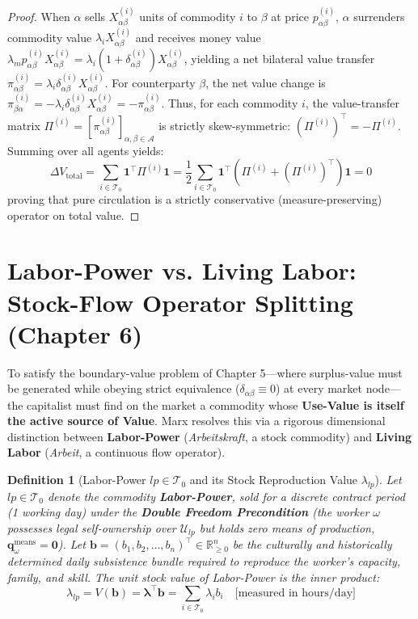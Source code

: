\documentclass[11pt,a4paper]{article}
\newtheorem{definition}{Definition}[section]
\begin{document}
\begin{proof}
When $\alpha$ sells $X_{\alpha \beta}^{(i)}$ units of commodity $i$ to $\beta$ at price $p_{\alpha \beta}^{(i)}$, $\alpha$ surrenders commodity value $\lambda_i X_{\alpha \beta}^{(i)}$ and receives money value $\lambda_m p_{\alpha \beta}^{(i)} X_{\alpha \beta}^{(i)} = \lambda_i (1 + \delta_{\alpha \beta}^{(i)}) X_{\alpha \beta}^{(i)}$, yielding a net bilateral value transfer $\pi_{\alpha \beta}^{(i)} = \lambda_i \delta_{\alpha \beta}^{(i)} X_{\alpha \beta}^{(i)}$. For counterparty $\beta$, the net value change is $\pi_{\beta \alpha}^{(i)} = -\lambda_i \delta_{\alpha \beta}^{(i)} X_{\alpha \beta}^{(i)} = -\pi_{\alpha \beta}^{(i)}$. Thus, for each commodity $i$, the value-transfer matrix $\Pi^{(i)} = [\pi_{\alpha \beta}^{(i)}]_{\alpha, \beta \in \mathcal{A}}$ is strictly skew-symmetric: $(\Pi^{(i)})^\top = -\Pi^{(i)}$. Summing over all agents yields:
\begin{equation}
    \Delta V_{\text{total}} = \sum_{i \in \mathcal{T}_0} \mathbf{1}^\top \Pi^{(i)} \mathbf{1} = \frac{1}{2} \sum_{i \in \mathcal{T}_0} \mathbf{1}^\top \left(\Pi^{(i)} + \left(\Pi^{(i)}\right)^\top\right) \mathbf{1} = 0
\end{equation}
proving that pure circulation is a strictly conservative (measure-preserving) operator on total value.
\end{proof}

\section{Labor-Power vs. Living Labor: Stock-Flow Operator Splitting (Chapter 6)}

To satisfy the boundary-value problem of Chapter 5---where surplus-value must be generated while obeying strict equivalence ($\delta_{\alpha \beta} \equiv 0$) at every market node---the capitalist must find on the market a commodity whose \textbf{Use-Value is itself the active source of Value}. Marx resolves this via a rigorous dimensional distinction between \textbf{Labor-Power} (\textit{Arbeitskraft}, a stock commodity) and \textbf{Living Labor} (\textit{Arbeit}, a continuous flow operator).

\begin{definition}[Labor-Power $lp \in \mathcal{T}_0$ and its Stock Reproduction Value $\lambda_{lp}$]
Let $lp \in \mathcal{T}_0$ denote the commodity \textbf{Labor-Power}, sold for a discrete contract period (1 working day) under the \textbf{Double Freedom Precondition} (the worker $\omega$ possesses legal self-ownership over $\mathcal{U}_{lp}$ but holds zero means of production, $\mathbf{q}_\omega^{\text{means}} = \mathbf{0}$). Let $\mathbf{b} = (b_1, b_2, \dots, b_n)^\top \in \mathbb{R}^n_{\ge 0}$ be the culturally and historically determined daily subsistence bundle required to reproduce the worker's capacity, family, and skill. The unit stock value of Labor-Power is the inner product:
\begin{equation}
    \lambda_{lp} = V(\mathbf{b}) = \boldsymbol{\lambda}^\top \mathbf{b} = \sum_{i \in \mathcal{T}_0} \lambda_i b_i \quad \text{[measured in hours/day]}
\end{equation}
\end{definition}
\end{document}
